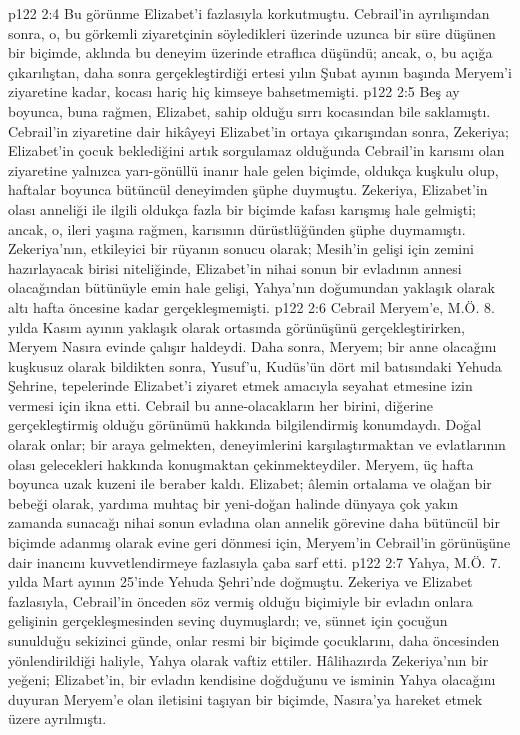 \vs p122 2:4 Bu görünme Elizabet’i fazlasıyla korkutmuştu. Cebrail’in ayrılışından sonra, o, bu görkemli ziyaretçinin söyledikleri üzerinde uzunca bir süre düşünen bir biçimde, aklında bu deneyim üzerinde etraflıca düşündü; ancak, o, bu açığa çıkarılıştan, daha sonra gerçekleştirdiği ertesi yılın Şubat ayının başında Meryem’i ziyaretine kadar, kocası hariç hiç kimseye bahsetmemişti.
\vs p122 2:5 Beş ay boyunca, buna rağmen, Elizabet, sahip olduğu sırrı kocasından bile saklamıştı. Cebrail’in ziyaretine dair hikâyeyi Elizabet’in ortaya çıkarışından sonra, Zekeriya; Elizabet’in çocuk beklediğini artık sorgulamaz olduğunda Cebrail’in karısını olan ziyaretine yalnızca yarı\hyp{}gönüllü inanır hale gelen biçimde, oldukça kuşkulu olup, haftalar boyunca bütüncül deneyimden şüphe duymuştu. Zekeriya, Elizabet’in olası anneliği ile ilgili oldukça fazla bir biçimde kafası karışmış hale gelmişti; ancak, o, ileri yaşına rağmen, karısının dürüstlüğünden şüphe duymamıştı. Zekeriya’nın, etkileyici bir rüyanın sonucu olarak; Mesih’in gelişi için zemini hazırlayacak birisi niteliğinde, Elizabet’in nihai sonun bir evladının annesi olacağından bütünüyle emin hale gelişi, Yahya’nın doğumundan yaklaşık olarak altı hafta öncesine kadar gerçekleşmemişti.
\vs p122 2:6 Cebrail Meryem’e, M.Ö. 8. yılda Kasım ayının yaklaşık olarak ortasında görünüşünü gerçekleştirirken, Meryem Nasıra evinde çalışır haldeydi. Daha sonra, Meryem; bir anne olacağını kuşkusuz olarak bildikten sonra, Yusuf’u, Kudüs’ün dört mil batısındaki Yehuda Şehrine, tepelerinde Elizabet’i ziyaret etmek amacıyla seyahat etmesine izin vermesi için ikna etti. Cebrail bu anne\hyp{}olacakların her birini, diğerine gerçekleştirmiş olduğu görünümü hakkında bilgilendirmiş konumdaydı. Doğal olarak onlar; bir araya gelmekten, deneyimlerini karşılaştırmaktan ve evlatlarının olası gelecekleri hakkında konuşmaktan çekinmekteydiler. Meryem, üç hafta boyunca uzak kuzeni ile beraber kaldı. Elizabet; âlemin ortalama ve olağan bir bebeği olarak, yardıma muhtaç bir yeni\hyp{}doğan halinde dünyaya çok yakın zamanda sunacağı nihai sonun evladına olan annelik görevine daha bütüncül bir biçimde adanmış olarak evine geri dönmesi için, Meryem’in Cebrail’in görünüşüne dair inancını kuvvetlendirmeye fazlasıyla çaba sarf etti.
\vs p122 2:7 Yahya, M.Ö. 7. yılda Mart ayının 25’inde Yehuda Şehri’nde doğmuştu. Zekeriya ve Elizabet fazlasıyla, Cebrail’in önceden söz vermiş olduğu biçimiyle bir evladın onlara gelişinin gerçekleşmesinden sevinç duymuşlardı; ve, sünnet için çocuğun sunulduğu sekizinci günde, onlar resmi bir biçimde çocuklarını, daha öncesinden yönlendirildiği haliyle, Yahya olarak vaftiz ettiler. Hâlihazırda Zekeriya’nın bir yeğeni; Elizabet’in, bir evladın kendisine doğduğunu ve isminin Yahya olacağını duyuran Meryem’e olan iletisini taşıyan bir biçimde, Nasıra’ya hareket etmek üzere ayrılmıştı.
